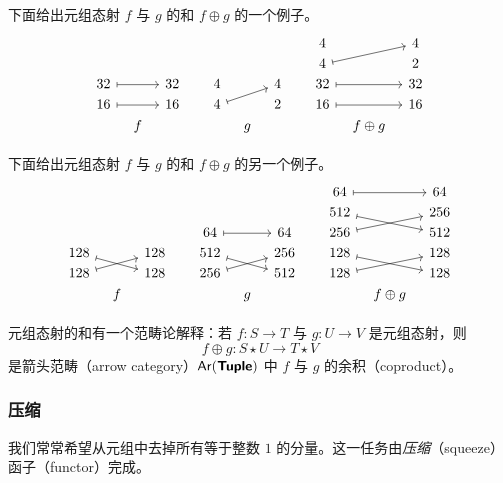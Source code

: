 \begin{example} \label{concatenationexample}
    下面给出元组态射 $f$ 与 $g$ 的和 $f \oplus g$ 的一个例子。
        \[ 
    \begin{tikzcd}[row sep = 1, column sep = 8]
    & & & & & & & & 4  & & 4 \\
      & & & & & & & &  4 \ar[rru,mapsto] & & 2\\
    32 \ar[rr, mapsto] & & 32 & & 4  & & 4 & & 32 \ar[rr,mapsto] & & 32\\
    16 \ar[rr,mapsto] & & 16 & & 4 \ar[rru ,mapsto]& & 2 & & 16 \ar[rr,mapsto] & & 16\\
    & f & & & & g & & & & f \oplus g  &  \\
    \end{tikzcd}
    \]
\end{example}

\begin{example}
    下面给出元组态射 $f$ 与 $g$ 的和 $f \oplus g$ 的另一个例子。
            \[ 
    \begin{tikzcd}[row sep = 1, column sep = 8]
    & & & & & & & & 64 \ar[rr,mapsto] & & 64 \\
    & & & & & & & & 512 \ar[rrd,mapsto]   & & 256 \\
      & & & & 64 \ar[rr,mapsto] & & 64& &  256 \ar[rru,mapsto] & & 512\\
    128 \ar[rrd, mapsto] & & 128 & & 512  \ar[rrd,mapsto] & & 256 & & 128 \ar[rrd,mapsto] & & 128\\
    128 \ar[rru,mapsto] & & 128 & & 256 \ar[rru ,mapsto]& & 512 & & 128 \ar[rru,mapsto] & & 128\\
    & f & & & & g & & & & f \oplus g  &  \\
    \end{tikzcd}
    \]
\end{example}

\begin{remark}
    元组态射的和有一个范畴论解释：若 $f:S \to T$ 与 $g:U \to V$ 是元组态射，则
    \[
    f \oplus g: S \star U \to T \star V
    \]
    是箭头范畴（arrow category）$\mathsf{Ar}({\boldsymbol{\mathsf{Tuple}}})$ 中 $f$ 与 $g$ 的余积（coproduct）。
\end{remark}

\subsubsection{压缩}

我们常常希望从元组中去掉所有等于整数 $1$ 的分量。这一任务由{\it 压缩}（squeeze）函子（functor）完成。

